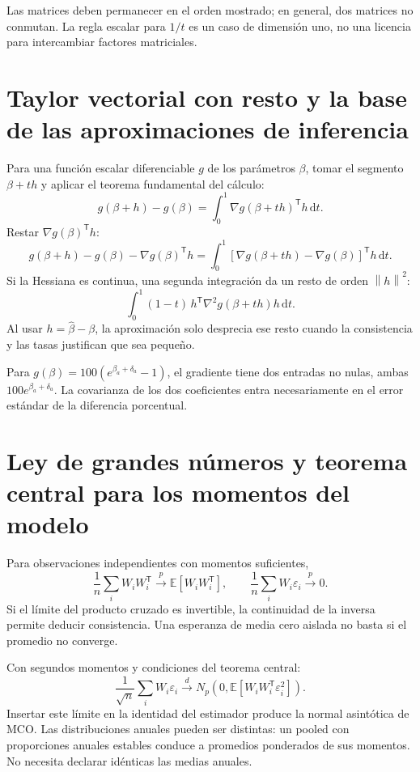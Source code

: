 \documentclass[11pt,a4paper]{article}
\newcommand{\E}{\mathbb E}
\newcommand{\norm}[1]{\left\lVert #1\right\rVert}
\begin{document}
Las matrices deben permanecer en el orden mostrado; en general, dos matrices no conmutan. La regla escalar para $1/t$ es un caso de dimensión uno, no una licencia para intercambiar factores matriciales.

\clearpage
\section{Taylor vectorial con resto y la base de las aproximaciones de inferencia}

Para una función escalar diferenciable $g$ de los parámetros $\beta$, tomar el segmento $\beta+t h$ y aplicar el teorema fundamental del cálculo:
\[
g(\beta+h)-g(\beta)
=\int_0^1\nabla g(\beta+t h)^{\mathsf T}h\,\mathrm dt.
\]
Restar $\nabla g(\beta)^{\mathsf T}h$:
\[
g(\beta+h)-g(\beta)-\nabla g(\beta)^{\mathsf T}h
=\int_0^1[\nabla g(\beta+t h)-\nabla g(\beta)]^{\mathsf T}h\,\mathrm dt.
\]
Si la Hessiana es continua, una segunda integración da un resto de orden $\norm h^2$:
\[
\int_0^1(1-t)\,h^{\mathsf T}
\nabla^2g(\beta+t h)h\,\mathrm dt.
\]
Al usar $h=\widehat\beta-\beta$, la aproximación solo desprecia ese resto cuando la consistencia y las tasas justifican que sea pequeño.

Para $g(\beta)=100(e^{\beta_a+\delta_a}-1)$, el gradiente tiene dos entradas no nulas, ambas $100e^{\beta_a+\delta_a}$. La covarianza de los dos coeficientes entra necesariamente en el error estándar de la diferencia porcentual.

\clearpage
\section{Ley de grandes números y teorema central para los momentos del modelo}

Para observaciones independientes con momentos suficientes,
\[
\frac1n\sum_iW_iW_i^{\mathsf T}
\xrightarrow{p}\E[W_iW_i^{\mathsf T}],\qquad
\frac1n\sum_iW_i\varepsilon_i\xrightarrow{p}0.
\]
Si el límite del producto cruzado es invertible, la continuidad de la inversa permite deducir consistencia. Una esperanza de media cero aislada no basta si el promedio no converge.

Con segundos momentos y condiciones del teorema central:
\[
\frac1{\sqrt n}\sum_iW_i\varepsilon_i
\xrightarrow{d}N_p\left(0,\E[W_iW_i^{\mathsf T}\varepsilon_i^2]\right).
\]
Insertar este límite en la identidad del estimador produce la normal asintótica de MCO. Las distribuciones anuales pueden ser distintas: un pooled con proporciones anuales estables conduce a promedios ponderados de sus momentos. No necesita declarar idénticas las medias anuales.
\end{document}
